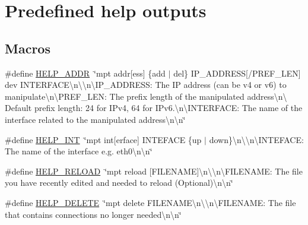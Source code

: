 \hypertarget{group___mpt_help}{\section{Predefined help outputs}
\label{group___mpt_help}
}
\subsection*{Macros}
\begin{DoxyCompactItemize}
\item 
\#define \hyperlink{group___mpt_help_ga50c0df023791ae0a02efd91863d86efb}{H\-E\-L\-P\-\_\-\-A\-D\-D\-R}~\char`\"{}mpt addr\mbox{[}ess\mbox{]} \{add $|$ del\} I\-P\-\_\-\-A\-D\-D\-R\-E\-S\-S\mbox{[}/P\-R\-E\-F\-\_\-\-L\-E\-N\mbox{]} dev I\-N\-T\-E\-R\-F\-A\-C\-E\textbackslash{}n\textbackslash{}\textbackslash{}n\textbackslash{}\-I\-P\-\_\-\-A\-D\-D\-R\-E\-S\-S\-: The I\-P address (can be v4 or v6) to manipulate\textbackslash{}n\textbackslash{}\-P\-R\-E\-F\-\_\-\-L\-E\-N\-:   The prefix length of the manipulated address\textbackslash{}n\textbackslash{}                Default prefix length\-: 24 for I\-Pv4, 64 for I\-Pv6.\textbackslash{}n\textbackslash{}\-I\-N\-T\-E\-R\-F\-A\-C\-E\-:  The name of the interface related to the manipulated address\textbackslash{}n\textbackslash{}n\char`\"{}
\item 
\#define \hyperlink{group___mpt_help_gaf505be684fba1e60298c721f30b9a0d3}{H\-E\-L\-P\-\_\-\-I\-N\-T}~\char`\"{}mpt int\mbox{[}erface\mbox{]} I\-N\-T\-E\-F\-A\-C\-E \{up $|$ down\}\textbackslash{}n\textbackslash{}\textbackslash{}n\textbackslash{}\-I\-N\-T\-E\-F\-A\-C\-E\-: The name of the interface e.\-g. eth0\textbackslash{}n\textbackslash{}n\char`\"{}
\item 
\#define \hyperlink{group___mpt_help_ga17ba7938d1129e4cc183c9eb077a6bee}{H\-E\-L\-P\-\_\-\-R\-E\-L\-O\-A\-D}~\char`\"{}mpt reload \mbox{[}F\-I\-L\-E\-N\-A\-M\-E\mbox{]}\textbackslash{}n\textbackslash{}\textbackslash{}n\textbackslash{}\-F\-I\-L\-E\-N\-A\-M\-E\-:   The file you have recently edited and needed to reload (Optional)\textbackslash{}n\textbackslash{}n\char`\"{}
\item 
\#define \hyperlink{group___mpt_help_ga6973c6a7b80a84245dfe8292715f303f}{H\-E\-L\-P\-\_\-\-D\-E\-L\-E\-T\-E}~\char`\"{}mpt delete F\-I\-L\-E\-N\-A\-M\-E\textbackslash{}n\textbackslash{}\textbackslash{}n\textbackslash{}\-F\-I\-L\-E\-N\-A\-M\-E\-:   The file that contains connections no longer needed\textbackslash{}n\textbackslash{}n\char`\"{}

\end{DoxyCompactItemize}
